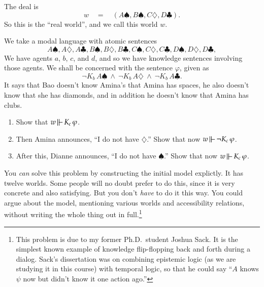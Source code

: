 \documentclass[11pt]{article}
\newcommand{\forces}{\,\mbox{$\mathrel\|\mathrel{\mkern-9mu}-\,$}}
\renewcommand{\phi}{\varphi}
\newcommand{\quadeq}{\quad = \quad}
\newcommand{\andd}{\wedge}
\newcommand{\nott}{\neg}
\begin{document}
\begin{enumerate}
 

The deal is
$$  w \quadeq (A\spadesuit,B\spadesuit,C\diamondsuit,D\clubsuit).$$
So this is the ``real world'', and we call this world $w$.

We take a modal language with atomic sentences
$$A\spadesuit, A\diamondsuit, A\clubsuit, 
B\spadesuit, B\diamondsuit, B\clubsuit,
C\spadesuit, C\diamondsuit, C\clubsuit,
D\spadesuit, D\diamondsuit, D\clubsuit,
$$
We have agents $a$, $b$, $c$, and $d$, and so we have knowledge sentences 
involving those agents.  We shall be concerned with the sentence $\phi$, given as
$$\nott K_b \, A\spadesuit \ \andd\ \nott K_b \, A\diamondsuit\ \andd\
\nott K_b \, A\clubsuit.$$
It says that Bao doesn't know Amina's that Amina has spaces, he also doesn't know that she has diamonds,
and in addition he doesn't know that Amina has clubs.


\begin{enumerate}
\item  Show that  $w\forces K_c\, \phi$.

\item  Then Amina announces, ``I do not have $\diamondsuit$.''
Show that now $w\forces \nott K_c\, \phi$.

\item After this,  Dianne announces, ``I do not have $\spadesuit$.''
Show that now  $w\forces K_c\, \phi$.

\end{enumerate}
You \emph{can} solve this problem by constructing the initial model explictly.
It has twelve worlds.    Some people will no doubt prefer to do this, since it is very concrete
and also satisfying.    But you don't \emph{have} to do it this way.   You could argue 
about the model, mentioning various worlds and accessibility relations, without writing the 
whole thing out in full.\footnote{This problem is due to my former Ph.D.~student Joshua Sack.
It is the simplest known example of knowledge flip-flopping back and forth during a dialog.
Sack's dissertation was on combining epistemic logic (as we are studying it in this course)
with temporal logic, so that he could say ``$A$ knows $\psi$ now but didn't know it one action ago.''
}

\end{enumerate}
\end{document}
